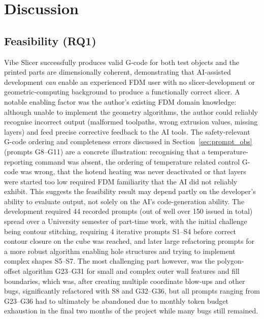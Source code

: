 \documentclass[10pt,twocolumn,a4paper]{article}
\begin{document}
\section{Discussion}
\label{sec:discussion}

\subsection{Feasibility (RQ1)}

Vibe Slicer successfully produces valid G-code for both test
objects and the printed parts are dimensionally coherent,
demonstrating that AI-assisted development \emph{can} enable an
experienced FDM user with no slicer-development or
geometric-computing background to produce a functionally correct
slicer.
A notable enabling factor was the author's existing FDM domain
knowledge: although unable to implement the geometry algorithms,
the author could reliably recognise incorrect output (malformed
toolpaths, wrong extrusion values, missing layers) and feed
precise corrective feedback to the AI tools. The safety-relevant
G-code ordering and completeness errors discussed in
Section~\ref{sec:prompt_obs} (prompts G8--G11) are a concrete
illustration: recognising that a temperature-reporting command was
absent, the ordering of temperature related control G-code was wrong, that the hotend heating was never deactivated or that layers were started too low required FDM familiarity that the AI did not reliably exhibit. This suggests the
feasibility result may depend partly on the developer's ability
to evaluate output, not solely on the AI's code-generation ability.
The development required 44 recorded prompts (out of well over 150
issued in total) spread over a University semester of part-time
work, with the initial challenge being contour stitching, requiring 4 iterative prompts S1--S4 before correct contour closure on the cube was reached, and later large refactoring prompts for a more robust algorithm enabling hole structures and trying to implement complex shapes S5--S7. The most challenging part however, was the polygon-offset algorithm G23--G31 for small and complex outer wall features and fill boundaries, which was, after creating multiple coordinate blow-ups and other bugs, significantly refactored with S8 and G32--G36, but all prompts ranging from G23--G36 had to ultimately be abandoned due to monthly token budget exhaustion in the final two months of the project while many bugs still remained.
\end{document}
